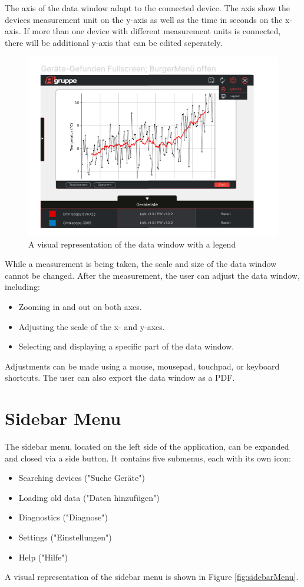\documentclass[]{scrreprt}
\begin{document}
 The axis of the data window adapt to the connected device. The axis show the devices measurement unit on the y-axis as well as the time in seconds on the x-axis.
 If more than one device with different measurement units is connected, there will be additional y-axis that can be edited seperately.


\begin{figure}
\includegraphics[width=.9\textwidth]{assets/pictures/Mainwindowopen.png}
\caption[]{A visual representation of the data window with a legend}
\label{fig:datawindow}
\end{figure}


While a measurement is being taken, the scale and size of the data window cannot be changed. After the measurement, the user can adjust the data window, including:
\begin{itemize}
\item Zooming in and out on both axes.
\item Adjusting the scale of the x- and y-axes.
\item Selecting and displaying a specific part of the data window.
\end{itemize}


Adjustments can be made using a mouse, mousepad, touchpad, or keyboard shortcuts. The user can also export the data window as a PDF.


\section{Sidebar Menu}


The sidebar menu, located on the left side of the application, can be expanded and closed via a side button. It contains five submenus, each with its own icon:
\begin{itemize}
\item Searching devices ("Suche Geräte")
\item Loading old data ("Daten hinzufügen")
\item Diagnostics ("Diagnose")
\item Settings ("Einstellungen")
\item Help ("Hilfe")
\end{itemize}
A visual representation of the sidebar menu is shown in Figure \ref{fig:sidebarMenu}.
\end{document}
